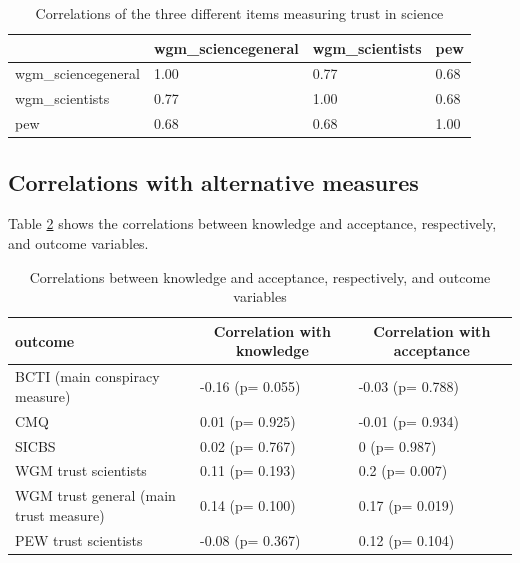 \documentclass[
  doc,floatsintext]{apa6}
\begin{document}
\begin{table}[h]

\begin{center}
\begin{threeparttable}

\caption{\label{tab:exp3-correlation-trust}Correlations of the three different items measuring trust in science}

\begin{tabular}{llll}
\toprule
 & \multicolumn{1}{c}{wgm\_sciencegeneral} & \multicolumn{1}{c}{wgm\_scientists} & \multicolumn{1}{c}{pew}\\
\midrule
wgm\_sciencegeneral & 1.00 & 0.77 & 0.68\\
wgm\_scientists & 0.77 & 1.00 & 0.68\\
pew & 0.68 & 0.68 & 1.00\\
\bottomrule
\end{tabular}

\end{threeparttable}
\end{center}

\end{table}

\subsection{Correlations with alternative measures}\label{correlations-with-alternative-measures-2}

Table \ref{tab:exp3-correlations-outcomes} shows the correlations between knowledge and acceptance, respectively, and outcome variables.

\begin{table}[tbp]

\begin{center}
\begin{threeparttable}

\caption{\label{tab:exp3-correlations-outcomes}Correlations between knowledge and acceptance, respectively, and outcome variables}

\begin{tabular}{lll}
\toprule
outcome & \multicolumn{1}{c}{Correlation with knowledge} & \multicolumn{1}{c}{Correlation with acceptance}\\
\midrule
BCTI 
(main conspiracy measure) & -0.16 (p= 0.055) & -0.03 (p= 0.788)\\
CMQ & 0.01 (p= 0.925) & -0.01 (p= 0.934)\\
SICBS & 0.02 (p= 0.767) & 0 (p= 0.987)\\
WGM trust scientists & 0.11 (p= 0.193) & 0.2 (p= 0.007)\\
WGM trust general 
(main trust measure) & 0.14 (p= 0.100) & 0.17 (p= 0.019)\\
PEW trust scientists & -0.08 (p= 0.367) & 0.12 (p= 0.104)\\
\bottomrule
\end{tabular}

\end{threeparttable}
\end{center}

\end{table}
\end{document}
